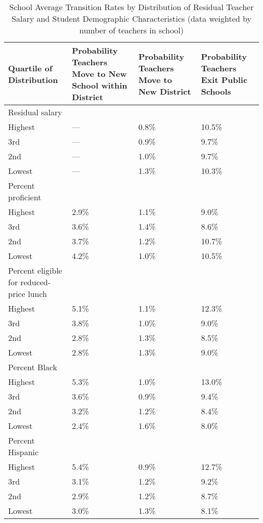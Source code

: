 \documentclass[]{article}
\begin{document}
\begin{table}[htbp]
\centering
\begin{tabular}{p{}p{}p{}p{}}
  \hline
Quartile of Distribution & Probability Teachers Move to New School within District & Probability Teachers Move to New District & Probability Teachers Exit Public Schools \\ 
  \hline
Residual salary & & & \\
\quad Highest & --- & 0.8\% & 10.5\% \\ 
  \quad 3rd & --- & 0.9\% & 9.7\% \\ 
  \quad 2nd & --- & 1.0\% & 9.7\% \\ 
  \quad Lowest & --- & 1.3\% & 10.3\% \\ 
Percent proficient & & & \\
  \quad Highest & 2.9\% & 1.1\% & 9.0\% \\ 
  \quad 3rd & 3.6\% & 1.4\% & 8.6\% \\ 
  \quad 2nd & 3.7\% & 1.2\% & 10.7\% \\ 
  \quad Lowest & 4.2\% & 1.0\% & 10.5\% \\ 
Percent eligible for reduced-price lunch & & & \\
  \quad Highest & 5.1\% & 1.1\% & 12.3\% \\ 
  \quad 3rd & 3.8\% & 1.0\% & 9.0\% \\ 
  \quad 2nd & 2.8\% & 1.3\% & 8.5\% \\ 
  \quad Lowest & 2.8\% & 1.3\% & 9.0\% \\ 
Percent Black & & & \\
  \quad Highest & 5.3\% & 1.0\% & 13.0\% \\ 
  \quad 3rd & 3.6\% & 0.9\% & 9.4\% \\ 
  \quad 2nd & 3.2\% & 1.2\% & 8.4\% \\ 
  \quad Lowest & 2.4\% & 1.6\% & 8.0\% \\ 
Percent Hispanic & & & \\
  \quad Highest & 5.4\% & 0.9\% & 12.7\% \\ 
  \quad 3rd & 3.1\% & 1.2\% & 9.2\% \\ 
  \quad 2nd & 2.9\% & 1.2\% & 8.7\% \\ 
  \quad Lowest & 3.0\% & 1.3\% & 8.1\% \\ 
   \hline
\end{tabular}
\caption{School Average Transition Rates by Distribution of Residual Teacher Salary and Student Demographic Characteristics (data weighted by number of teachers in school)} 
\label{tbl:change_by_quartile}
\end{table}
\end{document}
